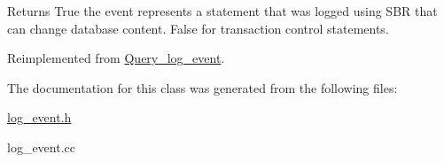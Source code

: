 \begin{DoxyReturn}{Returns}
True the event represents a statement that was logged using S\+BR that can change database content. False for transaction control statements. 
\end{DoxyReturn}


Reimplemented from \mbox{\hyperlink{classQuery__log__event_a2a3e67710fa962765847ed1df1552864}{Query\+\_\+log\+\_\+event}}.



The documentation for this class was generated from the following files\+:\begin{DoxyCompactItemize}
\item 
\mbox{\hyperlink{log__event_8h}{log\+\_\+event.\+h}}\item 
log\+\_\+event.\+cc\end{DoxyCompactItemize}
